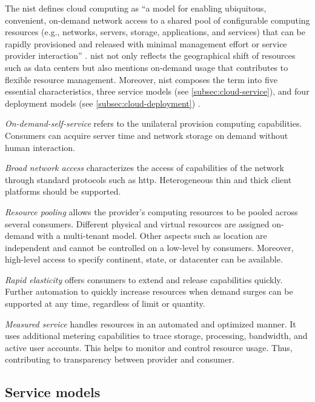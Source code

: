 The \ac{nist} defines cloud computing as \enquote{a model for enabling ubiquitous, convenient, on-demand network access to a shared pool of configurable computing resources (e.g., networks, servers, storage, applications, and services) that can be rapidly provisioned and released with minimal management effort or service provider interaction} \cite{Mell2011}.
\ac{nist} not only reflects the geographical shift of resources such as data centers but also mentions on-demand usage that contributes to flexible resource management.
Moreover, \ac{nist} composes the term into five essential characteristics, three service models (see \autoref{subsec:cloud-service}), and four deployment models (see \autoref{subsec:cloud-deployment}) \cite{Mell2011}.

\textit{On-demand-self-service} refers to the unilateral provision computing capabilities.
Consumers can acquire server time and network storage on demand without human interaction.

\textit{Broad network access} characterizes the access of capabilities of the network through standard protocols such as \ac{http}.
Heterogeneous thin and thick client platforms should be supported.

\textit{Resource pooling} allows the provider's computing resources to be pooled across several consumers.
Different physical and virtual resources are assigned on-demand with a multi-tenant model.
Other aspects such as location are independent and cannot be controlled on a low-level by consumers.
Moreover, high-level access to specify continent, state, or datacenter can be available.

\textit{Rapid elasticity} offers consumers to extend and release capabilities quickly.
Further automation to quickly increase resources when demand surges can be supported at any time, regardless of limit or quantity.

\textit{Measured service} handles resources in an automated and optimized manner.
It uses additional metering capabilities to trace storage, processing, bandwidth, and active user accounts.
This helps to monitor and control resource usage.
Thus, contributing to transparency between provider and consumer.

\subsection{Service models}
\label{subsec:cloud-service}

